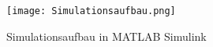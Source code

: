 

\begin{figure}[htb]
\texttt{[image: Simulationsaufbau.png]}
\caption{Simulationsaufbau in MATLAB Simulink}
\label{fig:Simulationsaufbau in MATLAB Simulink}
\end{figure}
